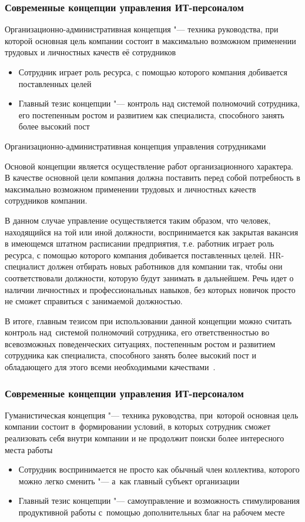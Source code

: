 \documentclass{../industrial-development}
\begin{document}
\begin{frame} \frametitle{Современные концепции управления ИТ-персоналом}
  	 \alert{Организационно-административная концепция} "--- техника руководства, при которой основная цель компании состоит в максимально возможном применении трудовых и личностных качеств её сотрудников
	  \begin{itemize}
	\item Сотрудник играет роль ресурса, с помощью которого компания добивается поставленных целей
	\item Главный тезис концепции "--- контроль над системой полномочий сотрудника, его постепенным ростом и развитием как специалиста, способного занять более высокий пост
	  \end{itemize}
 \end{frame}

\lecturenotes

\alert{Организационно-административная концепция управления сотрудниками}

Основой концепции является осуществление работ организационного характера. В качестве основной цели компания должна поставить перед собой потребность в максимально возможном применении трудовых и личностных качеств сотрудников компании.

В данном случае управление осуществляется таким образом, что человек, находящийся на той или иной должности, воспринимается как закрытая вакансия в имеющемся штатном расписании предприятия, т.е. работник играет роль ресурса, с помощью которого компания добивается поставленных целей. HR-специалист должен отбирать новых работников для компании так, чтобы они соответствовали должности, которую будут занимать в дальнейшем. Речь идет о наличии личностных и профессиональных навыков, без которых новичок просто не сможет справиться с занимаемой должностью. 

В итоге, главным тезисом при использовании данной концепции можно считать контроль над~системой полномочий сотрудника, его ответственностью во всевозможных поведенческих ситуациях, постепенным ростом и развитием сотрудника как специалиста, способного занять более высокий пост и обладающего для этого всеми необходимыми качествами~\cite{Sovrconcept}. 

\begin{frame} \frametitle{Современные концепции управления ИТ-персоналом}
 	 \alert{Гуманистическая концепция} "--- техника руководства, при~которой основная цель компании состоит в~формировании условий, в которых сотрудник сможет реализовать себя внутри компании и не продолжит поиски более интересного места работы 
		  \begin{itemize}
		\item Сотрудник воспринимается не просто как обычный член коллектива, которого можно легко сменить "--- а~как главный субъект организации
		\item Главный тезис концепции "--- самоуправление и возможность стимулирования продуктивной работы с~помощью дополнительных благ на рабочем месте
	  \end{itemize}
\end{frame}
\end{document}
